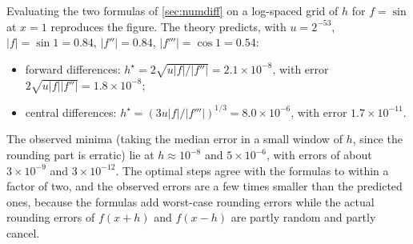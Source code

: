 \begin{solutions}
  \item Evaluating the two formulas of \cref{sec:numdiff} on a log-spaced grid of $h$ for $f = \sin$ at $x = 1$ reproduces the figure. The theory
        predicts, with $u = 2^{-53}$, $|f| = \sin1 = 0.84$, $|f''| = 0.84$, $|f'''| = \cos1 = 0.54$:
        \begin{itemize}[leftmargin=1.2em]
          \item forward differences: $h^\star = 2\sqrt{u|f|/|f''|} = 2.1\times10^{-8}$, with error $2\sqrt{u|f||f''|} = 1.8\times10^{-8}$;
          \item central differences: $h^\star = (3u|f|/|f'''|)^{1/3} = 8.0\times10^{-6}$, with error $1.7\times10^{-11}$.
        \end{itemize}
        The observed minima (taking the median error in a small window of $h$, since the rounding part is erratic) lie at $h \approx 10^{-8}$ and
        $5\times10^{-6}$, with errors of about $3\times10^{-9}$ and $3\times10^{-12}$. The optimal steps agree with the formulas to within a factor of
        two, and the observed errors are a few times smaller than the predicted ones, because the formulas add worst-case rounding errors while
        the actual rounding errors of $f(x + h)$ and $f(x - h)$ are partly random and partly cancel.
\end{solutions}
